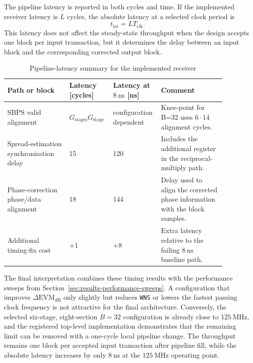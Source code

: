 The pipeline latency is reported in both cycles and time. If the implemented receiver latency is \(L\) cycles, the absolute latency at a selected clock period is
\begin{equation}
    t_{\mathrm{lat}} = L T_{\mathrm{clk}}.
    \label{eq:results-absolute-latency}
\end{equation}
This latency does not affect the steady-state throughput when the design accepts one block per input transaction, but it determines the delay between an input block and the corresponding corrected output block. 

\begin{table}[H]
\centering
\caption{Pipeline-latency summary for the implemented receiver}
\label{tab:results-pipeline-latency}
\small
\setlength{\tabcolsep}{3pt}
\begin{tabular}{@{}p{0.27\linewidth} p{0.18\linewidth} p{0.14\linewidth} p{0.29\linewidth}@{}}
\hline
Path or block & Latency [cycles] & Latency at \(8~\mathrm{ns}\) [ns] & Comment \\
\hline
\ac{SBPS} valid alignment & \(G_{\mathrm{stages}}G_{\mathrm{stage}}\) & configuration dependent & Knee-point for B=32 uses \(6\cdot14\) alignment cycles. \\
Spread-estimation synchronisation delay & 15 & 120 & Includes the additional register in the reciprocal-multiply path. \\
Phase-correction phase/data alignment & 18 & 144 & Delay used to align the corrected phase information with the block samples. \\
Additional timing-fix cost & +1 & +8 & Extra latency relative to the failing \(8~\mathrm{ns}\) baseline path. \\
\hline
\end{tabular}
\end{table}

The final interpretation combines these timing results with the performance sweeps from Section~\ref{sec:results-performance-sweeps}. A configuration that improves \(\Delta\mathrm{EVM}_{\mathrm{dB}}\) only slightly but reduces \texttt{WNS} or lowers the fastest passing clock frequency is not attractive for the final architecture. Conversely, the selected six-stage, eight-section \(B=32\) configuration is already close to \(125~\mathrm{MHz}\), and the registered top-level implementation demonstrates that the remaining limit can be removed with a one-cycle local pipeline change. The throughput remains one block per accepted input transaction after pipeline fill, while the absolute latency increases by only \(8~\mathrm{ns}\) at the \(125~\mathrm{MHz}\) operating point.
